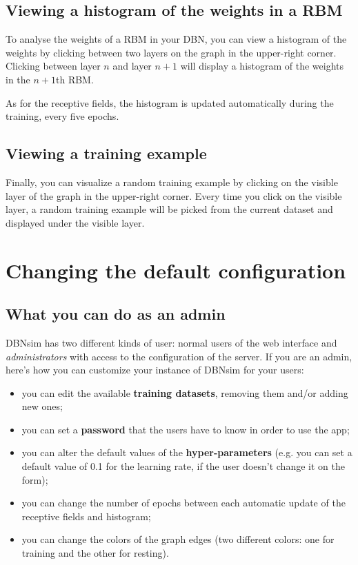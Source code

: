 \documentclass[a4paper]{article}
\begin{document}
		
	\subsection{Viewing a histogram of the weights in a RBM}

		
To analyse the weights of a RBM in your DBN, you can view a histogram of the weights by clicking between two layers on the graph in the upper-right corner. Clicking between layer $n$ and layer $n+1$ will display a histogram of the weights in the $n+1$th RBM.
		
As for the receptive fields, the histogram is updated automatically during the training, every five epochs.

		
	\subsection{Viewing a training example}

		
Finally, you can visualize a random training example by clicking on the visible layer of the graph in the upper-right corner. Every time you click on the visible layer, a random training example will be picked from the current dataset and displayed under the visible layer.
	


		
	\section{Changing the default configuration}


		
	\subsection{What you can do as an admin}

		
DBNsim has two different kinds of user: normal users of the web interface and \emph{administrators} with access to the configuration of the server. If you are an admin, here's how you can customize your instance of DBNsim for your users:
		
	\begin{itemize}
		
			
	\item you can edit the available \textbf{training datasets}, removing them and/or adding new ones;
			
	\item you can set a \textbf{password} that the users have to know in order to use the app;
			
	\item you can alter the default values of the \textbf{hyper-parameters} (e.g. you can set a default value of 0.1 for the learning rate, if the user doesn't change it on the form);
			
	\item you can change the number of epochs between each automatic update of the receptive fields and histogram;
			
	\item you can change the colors of the graph edges (two different colors: one for training and the other for resting).
		
	\end{itemize}
\end{document}
